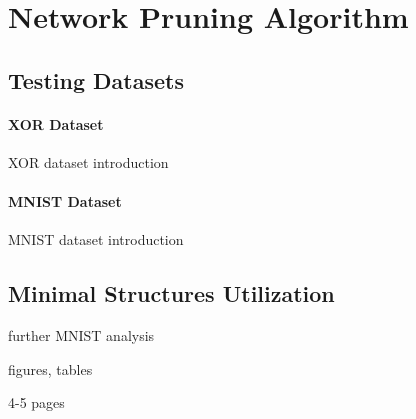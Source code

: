 \chapter{Network Pruning Algorithm}
\label{chapter:network_pruning_algorithm}

\section{Testing Datasets}

\subsubsection*{XOR Dataset}
XOR dataset introduction

\subsubsection*{MNIST Dataset}
MNIST dataset introduction

\section{Minimal Structures Utilization}
further MNIST analysis

figures, tables

4-5 pages
